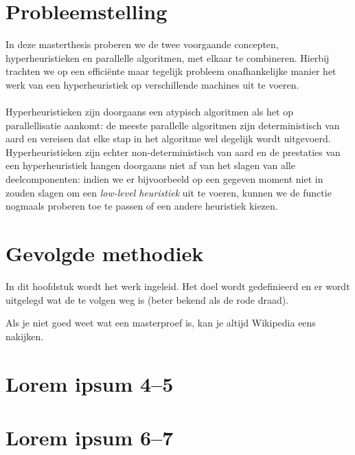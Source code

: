 \section{Probleemstelling}

In deze masterthesis proberen we de twee voorgaande concepten, hyperheuristieken en parallelle algoritmen, met elkaar te combineren. Hierbij trachten we op een effici\"ente maar tegelijk probleem onafhankelijke manier het werk van een hyperheuristiek op verschillende machines uit te voeren.

\paragraph{}

Hyperheuristieken zijn doorgaans een atypisch algoritmen als het op parallellisatie aankomt: de meeste parallelle algoritmen zijn deterministisch van aard en vereisen dat elke stap in het algoritme wel degelijk wordt uitgevoerd. Hyperheuristieken zijn echter non-deterministisch van aard en de prestaties van een hyperheuristiek hangen doorgaans niet af van het slagen van alle deelcomponenten: indien we er bijvoorbeeld op een gegeven moment niet in zouden slagen om een \emph{low-level heuristiek} uit te voeren, kunnen we de functie nogmaals proberen toe te passen of een andere heuristiek kiezen.

\section{Gevolgde methodiek}


In dit hoofdstuk wordt het werk ingeleid. Het doel wordt gedefinieerd en er
wordt uitgelegd wat de te volgen weg is (beter bekend als de rode draad).

Als je niet goed weet wat een masterproef is, kan je altijd
Wikipedia\cite{wiki} eens nakijken.

\section{Lorem ipsum 4--5}
\lipsum[4-5]

\section{Lorem ipsum 6--7}
\lipsum[6-7]

